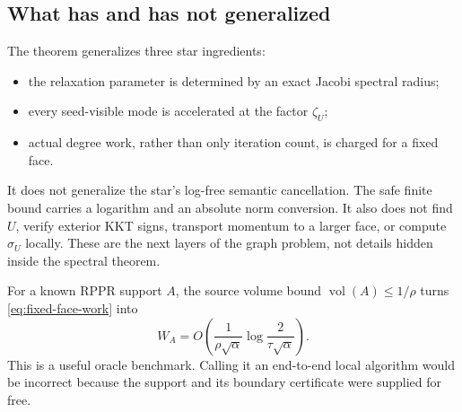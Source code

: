 \subsection{What has and has not generalized}

The theorem generalizes three star ingredients:

\begin{itemize}[leftmargin=*]
\item the relaxation parameter is determined by an exact Jacobi spectral
      radius;
\item every seed-visible mode is accelerated at the factor $\zeta_U$;
\item actual degree work, rather than only iteration count, is charged for a
      fixed face.
\end{itemize}

It does not generalize the star's log-free semantic cancellation.  The safe
finite bound carries a logarithm and an absolute norm conversion.  It also
does not find $U$, verify exterior KKT signs, transport momentum to a larger
face, or compute $\sigma_U$ locally.  These are the next layers of the graph
problem, not details hidden inside the spectral theorem.

For a known RPPR support $A$, the source volume bound
$\operatorname{vol}(A)\leq1/\rho$ turns
\eqref{eq:fixed-face-work} into
\begin{equation}
 W_A=O\!\left(
  \frac1{\rho\sqrt\alpha}
  \log\frac{2}{\tau\sqrt\alpha}
 \right).
 \label{eq:oracle-face-rppr-work}
\end{equation}
This is a useful oracle benchmark.  Calling it an end-to-end local algorithm
would be incorrect because the support and its boundary certificate were
supplied for free.
